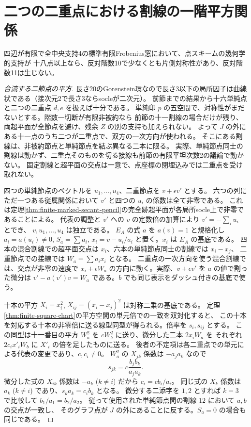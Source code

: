 \section{二つの二重点における割線の一階平方関係}
\label{sec:finite-two-double-five-space}
\begin{theorem}\label{thm:finite-two-double-five-space}
四辺が有限で全中央支持4の標準有限Frobenius窓において、点スキームの幾何学的支持が
十八点以上なら、反対階数10で少なくとも片側対称性があり、反対階数11は生じない。
\end{theorem}
\begin{proof}[合流する二節点の平方]
長さ20のGorenstein環なので長さ3以下の局所因子は曲線状である（接次元2で長さ3ならsocleが二次元）。
前節までの結果から十六単純点と二つの二重点 $d,e$ を扱えば十分である。
単純印 $p$ の五空間で、対称性がまだないとする。階数一切断が有限非被約なら
前節の十一割線の場合だけが残り、両超平面が全節点を避け、残余 $Z$ の別の支持も加えられない。
よって $J$ の外にある十一点のうち二つが二重点で、双方の一次方向が使われる。
そこにある割線は、非被約節点と単純節点を結ぶ異なる二本に限る。
実際、単純節点同士の割線は動かず、二重点そのものを切る接線も前節の有限平坦次数2の議論で動かない。
固定割線と超平面の交点は一意で、点座標の閉埋込みでは二重点を受け取れない。

四つの単純節点のベクトルを $u_1,\ldots,u_4$、二重節点を $v+\epsilon v'$ とする。
六つの列にただ一つある従属関係において $v'$ と四つの $u_i$ の係数は全て非零である。
これは定理\ref{thm:finite-marked-secant-pencil}の完全跡超平面が各局所socle上で非零であることによる。
代表の調整と $v'$ への $v$ の定数倍の加算により $v'=-\sum_i u_i$ とでき、
$v,u_1,\ldots,u_4$ は独立である。
$E_A$ の式 $a$ を $a(v)=1$ と規格化し $a_i=a(u_i)\ne0$,
$S_a=\sum a_i$, $x_i=v-u_i/a_i$ と置く。$x_i$ は $E_A$ の基底である。
四本の混合割線での超平面交点は $x_i$、六本の単純節点同士の割線では $x_i-x_j$、
二重節点での接線では $W_a=\sum a_i x_i$ となる。
二重点の一次方向を使う混合割線では、交点が非零の速度で
$x_i+\epsilon W_a$ の方向に動く。実際、$v+\epsilon v'$ を $a$ の値で割った微分は
$v'-a(v')v=W_a$ である。$b$ でも同じ表示をダッシュ付きの基底で使う。

十本の平方 $X_i=x_i^2$, $X_{ij}=(x_i-x_j)^2$ は対称二乗の基底である。
定理\ref{thm:finite-square-chart}の平方空間の単元倍での一致を双対化すると、
この十本を対応する十本の非零倍に送る線型同型が得られる。倍率を $s_i,s_{ij}$ とする。
この同型は十一番目の平方 $W_a^2$ を $cW_b^2$ に送り、微分した二本 $2x_i W_a$ を
それぞれ $2c_i x'_iW_b$ に $X'_i$ の倍を足したものに送る。
後者の不定項は各二重点での単元による代表の変更であり、$c,c_i\ne0$。
$W_a^2$ の $X_{jk}$ 係数は $-a_ja_k$ なので
\[
                   s_{jk}=c\frac{b_j b_k}{a_j a_k}.
\]
微分した式の $X_{ik}$ 係数は $-a_k$ ($k\ne i$) だから $c_i=c b_i/a_i$。
同じ式の $X_k$ 係数は $a_k$ ($k\ne i$) であり、$s_k a_k=c_i b_k$ となる。
微分する二添字を $1,2$ とすれば $k=3$ で比較して $b_1/a_1=b_2/a_2$。
従って使用された単純節点間の割線 $12$ において $a,b$ の交点が一致し、
そのグラフ点が $J$ の外にあることに反する。$S_a=0$ の場合も同じである。
\end{proof}
